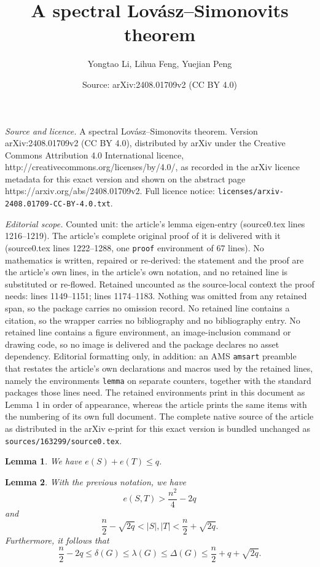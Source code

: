 \documentclass[10pt,a4paper]{amsart}
\title{A spectral Lov\'{a}sz--Simonovits theorem}
\author{Yongtao Li, Lihua Feng, Yuejian Peng}
\date{Source: arXiv:2408.01709v2 (CC BY 4.0)}
\newtheorem{lemma}{Lemma}
\begin{document}
\maketitle

\noindent\emph{Source and licence.} A spectral Lov\'{a}sz--Simonovits theorem. Version arXiv:2408.01709v2 (CC BY 4.0), distributed by arXiv under the Creative Commons Attribution 4.0 International licence, http://creativecommons.org/licenses/by/4.0/, as recorded in the arXiv licence metadata for this exact version and shown on the abstract page https://arxiv.org/abs/2408.01709v2. Full licence notice: \texttt{licenses/arxiv-2408.01709-CC-BY-4.0.txt}.\par\smallskip

\noindent\textit{Editorial scope.} Counted unit: the article's lemma eigen-entry (source0.tex lines 1216--1219). The article's complete original proof of it is delivered with it (source0.tex lines 1222--1288, one \texttt{proof} environment of 67 lines). No mathematics is written, repaired or re-derived: the statement and the proof are the article's own lines, in the article's own notation, and no retained line is substituted or re-flowed.  Retained uncounted as the source-local context the proof needs: lines 1149--1151; lines 1174--1183.  Nothing was omitted from any retained span, so the package carries no omission record.  No retained line contains a citation, so the wrapper carries no bibliography and no bibliography entry.  No retained line contains a figure environment, an image-inclusion command or drawing code, so no image is delivered and the package declares no asset dependency.  Editorial formatting only, in addition: an AMS \texttt{amsart} preamble that restates the article's own declarations and macros used by the retained lines, namely the environments \texttt{lemma} on separate counters, together with the standard packages those lines need.  The retained environments print in this document as Lemma 1 in order of appearance, whereas the article prints the same items with the numbering of its own full document.  The complete native source of the article as distributed in the arXiv e-print for this exact version is bundled unchanged as \texttt{sources/163299/source0.tex}.
\begin{lemma} \label{lem-ST-q}
We have $e(S) + e(T)\le q$. 
\end{lemma}

\begin{lemma} \label{refine-degree}
With the previous notation, we have  
\[ e(S,T) > \frac{n^2}{4}  - 2q   \]
and 
 \[ \frac{n}{2} -  \sqrt{2q} < |S|, |T| 
 < \frac{n}{2} +\sqrt{2q}.  \]
Furthermore, it follows that  
\[  \frac{n}{2} -2q \le \delta(G) \le 
\lambda (G)\le \Delta (G) \le \frac{n}{2} + q + \sqrt{2q}.  \]
\end{lemma}
\end{document}

